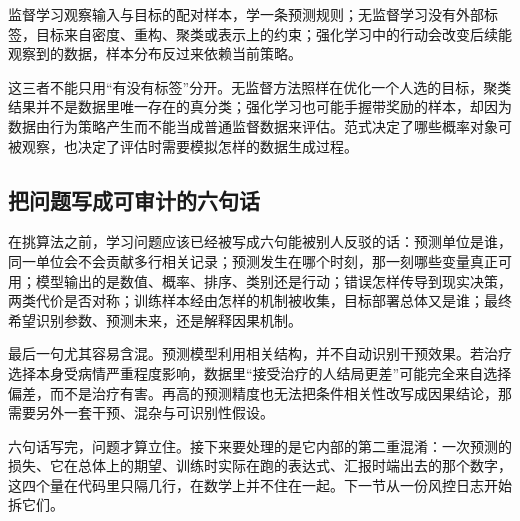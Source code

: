 监督学习观察输入与目标的配对样本，学一条预测规则；无监督学习没有外部标签，目标来自密度、重构、聚类或表示上的约束；强化学习中的行动会改变后续能观察到的数据，样本分布反过来依赖当前策略。

这三者不能只用``有没有标签''分开。无监督方法照样在优化一个人选的目标，聚类结果并不是数据里唯一存在的真分类；强化学习也可能手握带奖励的样本，却因为数据由行为策略产生而不能当成普通监督数据来评估。范式决定了哪些概率对象可被观察，也决定了评估时需要模拟怎样的数据生成过程。

\subsection{把问题写成可审计的六句话}

在挑算法之前，学习问题应该已经被写成六句能被别人反驳的话：预测单位是谁，同一单位会不会贡献多行相关记录；预测发生在哪个时刻，那一刻哪些变量真正可用；模型输出的是数值、概率、排序、类别还是行动；错误怎样传导到现实决策，两类代价是否对称；训练样本经由怎样的机制被收集，目标部署总体又是谁；最终希望识别参数、预测未来，还是解释因果机制。

最后一句尤其容易含混。预测模型利用相关结构，并不自动识别干预效果。若治疗选择本身受病情严重程度影响，数据里``接受治疗的人结局更差''可能完全来自选择偏差，而不是治疗有害。再高的预测精度也无法把条件相关性改写成因果结论，那需要另外一套干预、混杂与可识别性假设。

六句话写完，问题才算立住。接下来要处理的是它内部的第二重混淆：一次预测的损失、它在总体上的期望、训练时实际在跑的表达式、汇报时端出去的那个数字，这四个量在代码里只隔几行，在数学上并不住在一起。下一节从一份风控日志开始拆它们。
